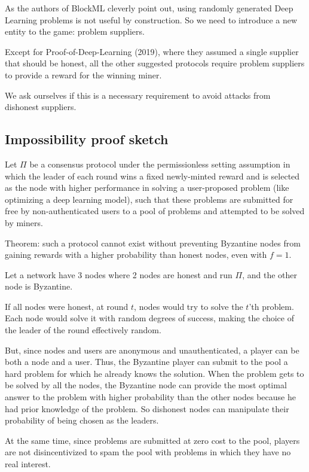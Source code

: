 \documentclass[conference]{IEEEtran}
\begin{document}
    As the authors of BlockML cleverly point out, using randomly generated Deep Learning problems is not useful by construction. So we need to introduce a new entity to the game: problem suppliers.
    
    Except for Proof-of-Deep-Learning (2019), where they assumed a single supplier that should be honest, all the other suggested protocols require problem suppliers to provide a reward for the winning miner.
    
    We ask ourselves if this is a necessary requirement to avoid attacks from dishonest suppliers.
    
    \subsection{Impossibility proof sketch}
    
    Let $\Pi$ be a consensus protocol under the permissionless setting assumption in which the leader of each round wins a fixed newly-minted reward and is selected as the node with higher performance in solving a user-proposed problem (like optimizing a deep learning model), such that these problems are submitted for free by non-authenticated users to a pool of problems and attempted to be solved by miners.
    
    Theorem: such a protocol cannot exist without preventing Byzantine nodes from gaining rewards with a higher probability than honest nodes, even with $f=1$.
    
    Let a network have 3 nodes where 2 nodes are honest and run $\Pi$, and the other node is Byzantine.
    
    If all nodes were honest, at round $t$, nodes would try to solve the $t$'th problem. Each node would solve it with random degrees of success, making the choice of the leader of the round effectively random.
    
    But, since nodes and users are anonymous and unauthenticated, a player can be both a node and a user. Thus, the Byzantine player can submit to the pool a hard problem for which he already knows the solution. When the problem gets to be solved by all the nodes, the Byzantine node can provide the most optimal answer to the problem with higher probability than the other nodes because he had prior knowledge of the problem. So dishonest nodes can manipulate their probability of being chosen as the leaders.
    
    At the same time, since problems are submitted at zero cost to the pool, players are not disincentivized to spam the pool with problems in which they have no real interest.
    
\end{document}
